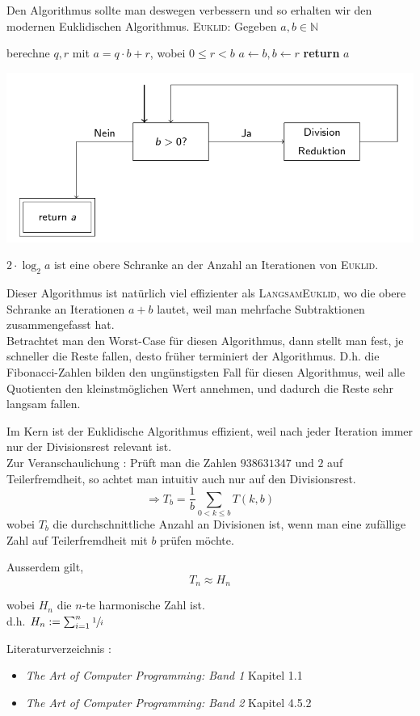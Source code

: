 \documentclass {article}
\begin{document}
Den Algorithmus sollte man deswegen verbessern und so erhalten wir den modernen Euklidischen Algorithmus.
\newpage
	\textsc{Euklid}: Gegeben $a,b \in \mathbb{N}$
	 \begin{algorithmic}[1]
		\State berechne $q,r$ mit $a=q\cdot b+r$, wobei $0\leq r < b$
		\State $a\gets b, b\gets r$
		\EndWhile
		\State \textbf{return} $a$
	\end{algorithmic}	
	\begin{center}
	\includegraphics[scale=0.4]{euklid}
	\end{center}
	\vspace{10pt}
	$2\cdot \log_2{a}$ ist eine obere Schranke an der Anzahl an Iterationen von \textsc{Euklid}.
	
	Dieser Algorithmus ist nat\"urlich viel effizienter als \textsc{LangsamEuklid}, wo die obere Schranke an Iterationen $a+b$ lautet, weil man mehrfache Subtraktionen zusammengefasst hat.\\


Betrachtet man den Worst-Case f\"ur diesen Algorithmus, dann stellt man fest, je schneller die Reste fallen, desto fr\"uher terminiert der Algorithmus. D.h. die Fibonacci-Zahlen bilden den ung\"unstigsten Fall f\"ur diesen Algorithmus, weil alle Quotienten den kleinstm\"oglichen Wert annehmen, und dadurch die Reste sehr langsam fallen.

Im Kern ist der Euklidische Algorithmus effizient, weil nach jeder Iteration immer nur der Divisionsrest relevant ist.\\
Zur Veranschaulichung : Pr\"uft man die Zahlen $938631347$ und $2$ auf Teilerfremdheit, so achtet man intuitiv auch nur auf den Divisionsrest.
	$$\Rightarrow T_{b} = \frac{1}{b} \sum_{0 < k\leq b} T(k,b)$$ wobei $T_{b}$ die durchschnittliche Anzahl an Divisionen ist, wenn man eine zuf\"allige Zahl auf Teilerfremdheit mit $b$ pr\"ufen m\"ochte.

Ausserdem gilt,
	$$T_n \approx H_n$$
	\begin{flushright}
	wobei $H_n$ die $n$-te harmonische Zahl ist.\\
	d.h. $H_n := \sum_{i=1}^{n}\sfrac{1}{i}$	
	\end{flushright}	
\vspace*{10pt}
Literaturverzeichnis :
\begin{itemize}
\item \textit{The Art of Computer Programming: Band 1} Kapitel 1.1
\item \textit{The Art of Computer Programming: Band 2} Kapitel 4.5.2
\end{itemize}
\end{document}
